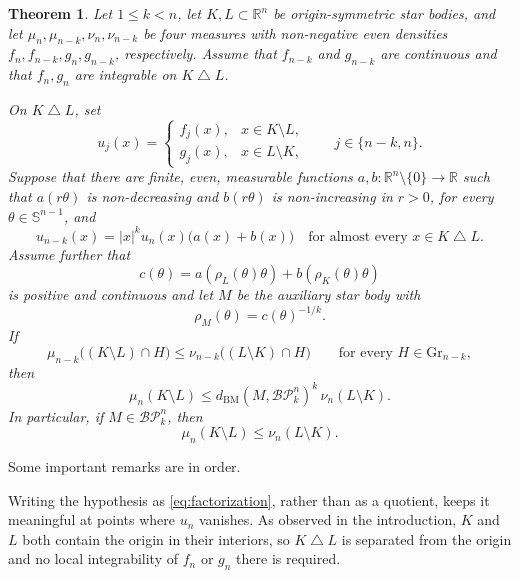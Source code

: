 \documentclass{amsart}
\newtheorem{theorem}{Theorem}
\theoremstyle{remark}
\newcommand{\R}{\mathbb{R}}
\newcommand{\Sph}{\mathbb{S}}
\newcommand{\BP}{\mathcal{BP}}
\newcommand{\Gr}{\mathrm{Gr}}
\begin{document}
\begin{theorem}\label{thm:main}
Let $1\leq k<n$, let $K,L\subset\R^n$ be origin-symmetric star bodies, and
let $\mu_n,\mu_{n-k},\nu_n,\nu_{n-k}$ be four measures with non-negative even densities
$f_n,f_{n-k},g_n,g_{n-k}$, respectively. Assume that $f_{n-k}$ and
$g_{n-k}$ are continuous and that $f_n,g_n$ are integrable on
$K\mathbin\triangle L$.

On $K\mathbin\triangle L$, set
\[
 u_j(x)=
 \begin{cases}
  f_j(x),&x\in K\setminus L,\\
  g_j(x),&x\in L\setminus K,
 \end{cases}
 \qquad j\in\{n-k,n\}.
\]
Suppose that there are finite, even, measurable functions
$a,b:\R^n\setminus\{0\}\to\R$ such that $a(r\theta)$ is non-decreasing and
$b(r\theta)$ is non-increasing in $r>0$, for every
$\theta\in\Sph^{n-1}$, and
\begin{equation}\label{eq:factorization}
 u_{n-k}(x)=|x|^k u_n(x)\bigl(a(x)+b(x)\bigr)
 \quad\text{for almost every }x\in K\mathbin\triangle L.
\end{equation}
Assume further that
\begin{equation}\label{eq:M}
 c(\theta)
 =a(\rho_L(\theta)\theta)+b(\rho_K(\theta)\theta)
\end{equation}
is positive and continuous and let $M$ be the auxiliary star body with
\[
 \rho_M(\theta)=c(\theta)^{-1/k}.
\]
If
\begin{equation}\label{eq:section-hypothesis}
 \mu_{n-k}\bigl((K\setminus L)\cap H\bigr)
 \leq
 \nu_{n-k}\bigl((L\setminus K)\cap H\bigr)
 \qquad\text{for every }H\in\Gr_{n-k},
\end{equation}
then
\begin{equation}\label{eq:main-conclusion}
 \mu_n(K\setminus L)
 \leq d_{\mathrm{BM}}(M,\BP_k^n)^k\,
       \nu_n(L\setminus K).
\end{equation}
In particular, if $M\in\BP_k^n$, then
\[
 \mu_n(K\setminus L)\leq\nu_n(L\setminus K).
\]
\end{theorem}

Some important remarks are in order.

Writing the hypothesis as \eqref{eq:factorization}, rather than as a quotient,
keeps it meaningful at points where $u_n$ vanishes. As observed in the
introduction, $K$ and $L$ both contain the origin in their interiors, so
$K\mathbin\triangle L$ is separated from the origin and no local integrability
of $f_n$ or $g_n$ there is required.
\end{document}
